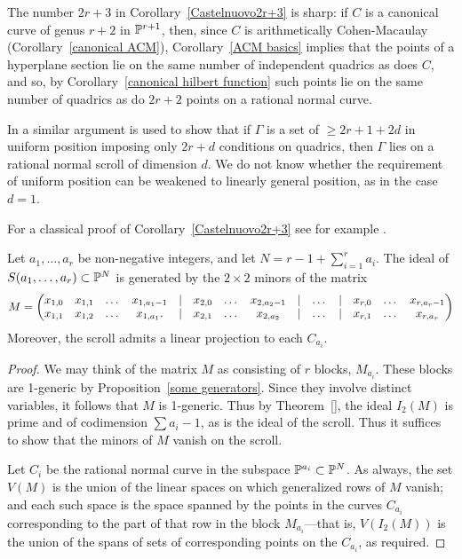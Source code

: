 \begin{remark}
 The number $2r+3$ in Corollary~\ref{Castelnuovo2r+3} is sharp: if $C$ is a canonical curve of genus $r+2$ in ${\mathbb P}^{r+1}$, then, since $C$
 is arithmetically Cohen-Macaulay (Corollary~\ref{canonical ACM}), Corollary~\ref{ACM basics} implies that the points of a hyperplane 
 section lie on the same number of independent quadrics as does $C$, and so,
 by Corollary~\ref{canonical hilbert function} such points lie on the same number of
 quadrics as do $2r+2$ points on a rational normal curve.
 
In \cite{} a similar argument is used to show that if $\Gamma$ is a set of $\geq 2r+1+2d$ in uniform position
imposing only
$2r+d$ conditions on quadrics, then $\Gamma$ lies on a rational normal scroll of dimension $d$.
We do not know whether the requirement of uniform position can be weakened to linearly general position,
as in the case $d=1$.

For a classical proof of Corollary~\ref{Castelnuovo2r+3} see for example \cite[]{Griffiths-Harris}.
\end{remark}

\begin{corollary}\label{equations of scrolls} Let $a_{1}, \dots, a_{r}$ be non-negative integers, and let $N = r-1+\sum_{i=1}^{r} a_{i}$.
The ideal of $S(a_{1},\dots,a_{r})\subset {\mathbb P}^{N}$ is generated by the $2\times 2$ minors of the matrix
{\footnotesize
$$
\setcounter{MaxMatrixCols}{20}
M = \begin{pmatrix}
x_{1,0}&x_{1,1}&\dots&x_{1, a_{1}-1}&|&x_{2,0}&\dots&x_{2, a_{2}-1}&|&\dots&|&x_{r,0}&\dots&x_{r, a_{r}-1}\\
x_{1,1}&x_{1,2}&\dots&x_{1, a_{1}}.  &|&x_{2,1}&\dots&x_{2, a_{2}}&|&\dots&|&x_{r,1}&\dots&x_{r, a_{r}}
\end{pmatrix}
$$
}
Moreover, the scroll admits a linear projection to each $C_{a_i}$.
\end{corollary}

\begin{proof} We may think of the matrix $M$ as consisting of $r$ blocks, $M_{a_{i}}$. These blocks are 1-generic by Proposition~\ref{some generators}. Since they involve distinct variables, it follows that $M$ is 1-generic. Thus by
Theorem~\ref{}, the ideal $I_{2}(M)$ is prime and of codimension $\sum a_{i}-1$, as is the ideal of the scroll. Thus it suffices to show that the minors of $M$ vanish on the scroll.

Let $C_{i}$ be the rational normal curve in the subspace ${\mathbb P}^{a_{i}}\subset{\mathbb P}^{N}$.
As always, the set $V(M)$ is the union of the linear spaces on which generalized rows of $M$ vanish; and each such space is the space spanned by the points in the curves $C_{a_{i}}$ corresponding to the part of that row in the block $M_{a_{i}}$---that is, $V(I_{2}(M))$ is the union of the spans of sets of corresponding points on the $C_{a_{i}}$, as required.
\end{proof}

